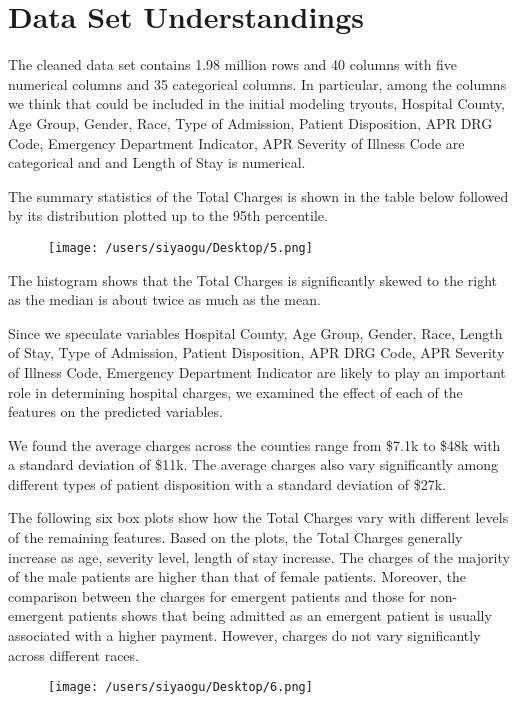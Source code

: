\documentclass[journal, a4paper,11pt]{IEEEtran}
\begin{document}
\section{Data Set Understandings}
	The cleaned data set contains 1.98 million rows and 40 columns with five numerical columns and 35 categorical columns. In particular, among the columns we think that could be included in the initial modeling tryouts, Hospital County, Age Group, Gender, Race, Type of Admission, Patient Disposition, APR DRG Code, Emergency Department Indicator, APR Severity of Illness Code are categorical and and Length of Stay is numerical. 
    
	The summary statistics of the Total Charges is shown in the table below followed by its distribution plotted up to the 95th percentile. 

    	\begin{figure}[ht]
	\centering
	\texttt{[image: /users/siyaogu/Desktop/5.png]}
	\end{figure}
	
	The histogram shows that the Total Charges is significantly skewed to the right as the median is about twice as much as the mean. 

	Since we speculate variables Hospital County, Age Group, Gender, Race, Length of Stay, Type of Admission, Patient Disposition, APR DRG Code, APR Severity of Illness Code, Emergency Department Indicator are likely to play an important role in determining hospital charges, we examined the effect of each of the features on the predicted variables. 

	We found the average charges across the counties range from \$7.1k to \$48k with a standard deviation of \$11k. The average charges also vary significantly among different types of patient disposition with a standard deviation of  \$27k. 
	
	The following six box plots show how the Total Charges vary with different levels of the remaining features. Based on the plots, the Total Charges generally increase as age, severity level, length of stay increase. The charges of the majority of the male patients are higher than that of female patients. Moreover, the comparison between the charges for emergent patients and those for non-emergent patients shows that being admitted as an emergent patient is usually associated with a higher payment. However, charges do not vary significantly across different races.

	\begin{figure}[ht]
	\centering
	\texttt{[image: /users/siyaogu/Desktop/6.png]}
	\end{figure}
\end{document}
